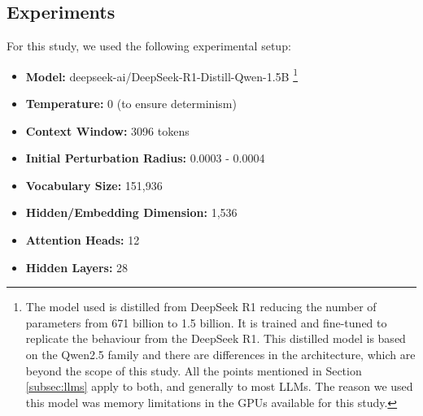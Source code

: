 \documentclass[a4paper,12pt]{article}
\begin{document}







\subsection{Experiments}
\label{subsec:experiments}

For this study, we used the following experimental setup:
\begin{itemize}
    \item \textbf{Model:} deepseek-ai/DeepSeek-R1-Distill-Qwen-1.5B \cite{deepseek2025r1distillqwen1.5b} \footnote{The model used is distilled from DeepSeek R1 reducing the number of parameters from 671 billion to 1.5 billion. It is trained and fine-tuned to replicate the behaviour from the DeepSeek R1. This distilled model is based on the Qwen2.5 family and there are differences in the architecture, which are beyond the scope of this study. All the points mentioned in Section \ref{subsec:llms} apply to both, and generally to most LLMs. The reason we used this model was memory limitations in the GPUs available for this study.}
    \item \textbf{Temperature:} 0 (to ensure determinism)
    \item \textbf{Context Window:} 3096 tokens
    \item \textbf{Initial Perturbation Radius:} 0.0003 - 0.0004 %
    \item \textbf{Vocabulary Size:} 151,936
    \item \textbf{Hidden/Embedding Dimension:} 1,536
    \item \textbf{Attention Heads:} 12
    \item \textbf{Hidden Layers:} 28
\end{itemize}
\end{document}
